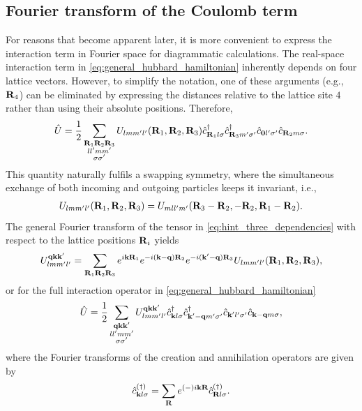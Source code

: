 \documentclass[\main/main.tex]{subfiles}
\begin{document}
\subsection{Fourier transform of the Coulomb term}

For reasons that become apparent later, it is more convenient to express the interaction term in Fourier space for diagrammatic calculations. The real-space interaction term in \eqref{eq:general_hubbard_hamiltonian} inherently depends on four lattice vectors. However, to simplify the notation, one of these arguments (e.g., $\textbf{R}_4$) can be eliminated by expressing the distances relative to the lattice site $4$ rather than using their absolute positions. Therefore, 
\begin{align}
	\hat U=\frac 12 \sum_{\substack{\textbf{R}_1\textbf{R}_2\textbf{R}_3\\ ll'mm'\\\sigma\sigma'}}U_{lmm'l'}(\textbf{R}_1,\textbf{R}_2,\textbf{R}_3) \hat c^{\dagger}_{\textbf{R}_1l\sigma} \hat c^{\dagger}_{\textbf{R}_3 m'\sigma'} \hat c_{\textbf{0}l'\sigma'} \hat c_{\textbf{R}_2m\sigma}.\label{eq:hint_three_dependencies}
\end{align} 
This quantity naturally fulfils a swapping symmetry, where the simultaneous exchange of both incoming and outgoing particles keeps it invariant, i.e.,
\begin{align}
 	U_{lmm'l'}(\textbf{R}_1,\textbf{R}_2,\textbf{R}_3)=U_{mll'm'}(\textbf{R}_3-\textbf{R}_2,-\textbf{R}_2,\textbf{R}_1-\textbf{R}_2).
\end{align} 
The general Fourier transform of the tensor in \eqref{eq:hint_three_dependencies} with respect to the lattice positions $\textbf{R}_i$ yields
\begin{align}
	U_{lmm'l'}^{\textbf{qkk}'}=\sum_{\textbf{R}_1\textbf{R}_2\textbf{R}_3} e^{i\textbf{kR}_1}e^{-i(\textbf{k}-\textbf{q})\textbf{R}_2}e^{-i(\textbf{k}'-\textbf{q})\textbf{R}_3}U_{lmm'l'}(\textbf{R}_1,\textbf{R}_2,\textbf{R}_3),
\end{align}
or for the full interaction operator in \eqref{eq:general_hubbard_hamiltonian}
\begin{align}
	\hat U=\frac 12 \sum_{\substack{\textbf{qkk}'\\ ll'mm'\\\sigma\sigma'}}U_{lmm'l'}^{\textbf{qkk}'}\hat c^{\dagger}_{\textbf{k}l\sigma} \hat c^{\dagger}_{\textbf{k}'-\textbf{q} m'\sigma'} \hat c_{\textbf{k}'l'\sigma'} \hat c_{\textbf{k}-\textbf{q}m\sigma},
\end{align}
where the Fourier transforms of the creation and annihilation operators are given by
\begin{align}
	\hat c^{(\dagger)}_{\textbf{k}l\sigma}=\sum_{\textbf{R}}e^{(-)i\textbf{kR}}\hat c^{(\dagger)}_{\textbf{R}l\sigma}.
\end{align}
\end{document}

